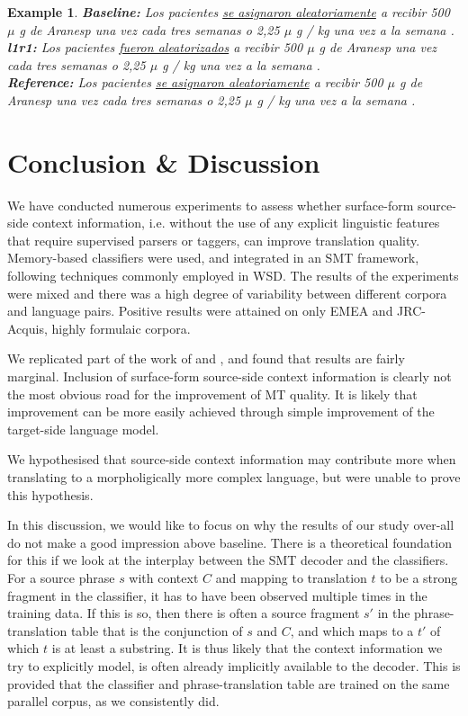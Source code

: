 \documentclass[smallextended]{svjour3}       %
\theoremstyle{break}
\newtheorem{exmp}{Example}[section]
\begin{document}
\begin{exmp}
\footnotesize
\label{ex:QAnegative}
\textbf{Baseline:} Los pacientes \underline{se asignaron aleatoriamente} a recibir 500 $\mu$ g de Aranesp una vez cada tres semanas o 2,25 $\mu$ g / kg una vez a la semana . \\
\textbf{l1r1:} Los pacientes \underline{fueron aleatorizados} a recibir 500 $\mu$ g de Aranesp una vez cada tres semanas o 2,25 $\mu$ g / kg una vez a la semana . \\
\textbf{Reference:} Los pacientes \underline{se asignaron aleatoriamente} a recibir 500 $\mu$ g de Aranesp una vez cada tres semanas o 2,25 $\mu$ g / kg una vez a la semana .
\end{exmp}


\section{Conclusion \& Discussion} 

We have conducted numerous experiments to assess whether surface-form
source-side context information, i.e. without the use of any explicit
linguistic features that require supervised parsers or taggers, can improve
translation quality. Memory-based classifiers were used, and integrated in an
SMT framework, following techniques commonly employed in WSD. The results of
the experiments were mixed and there was a high degree of variability between
different corpora and language pairs. Positive results were attained on only
EMEA and JRC-Acquis, highly formulaic corpora. 

We replicated part of the work of \cite{Stroppa+07} and \cite{Rejwanul+11}, and
found that results are fairly marginal. Inclusion of surface-form
source-side context information is clearly not the most obvious road for the
improvement of MT quality. It is likely that improvement can be more easily
achieved through simple improvement of the target-side language model.

We hypothesised that source-side context information may contribute more when
translating to a morpholigically more complex language, but were unable to
prove this hypothesis. 

In this discussion, we would like to focus on why the results of our study over-all do not make a good impression above baseline.  There is a theoretical foundation for this
if we look at the interplay between the SMT decoder and the classifiers. For a
source phrase $s$ with context $C$ and mapping to translation $t$ to be a
strong fragment in the classifier, it has to have been observed multiple times
in the training data. If this is so, then there is often a source fragment $s'$
in the phrase-translation table that is the conjunction of $s$ and $C$, and
which maps to a $t'$ of which $t$ is at least a substring. It is thus likely that the
context information we try to explicitly model, is often already implicitly
available to the decoder. This is provided that the classifier and
phrase-translation table are trained on the same parallel corpus, as we
consistently did.







\end{document}
